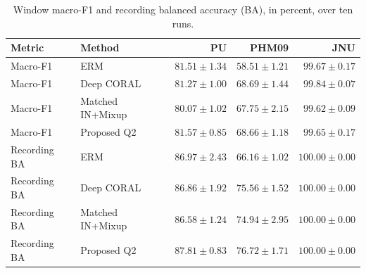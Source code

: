 \begin{table}[pos=htbp]
\centering\small
\caption{Window macro-F1 and recording balanced accuracy (BA), in percent, over ten runs.}
\label{tab:f1}
\begin{tabular}{llrrr}
\toprule
Metric & Method & PU & PHM09 & JNU\\
\midrule
Macro-F1 & ERM & $81.51\pm1.34$ & $58.51\pm1.21$ & $99.67\pm0.17$\\
Macro-F1 & Deep CORAL & $81.27\pm1.00$ & $68.69\pm1.44$ & $99.84\pm0.07$\\
Macro-F1 & Matched IN+Mixup & $80.07\pm1.02$ & $67.75\pm2.15$ & $99.62\pm0.09$\\
Macro-F1 & Proposed Q2 & $81.57\pm0.85$ & $68.66\pm1.18$ & $99.65\pm0.17$\\
Recording BA & ERM & $86.97\pm2.43$ & $66.16\pm1.02$ & $100.00\pm0.00$\\
Recording BA & Deep CORAL & $86.86\pm1.92$ & $75.56\pm1.52$ & $100.00\pm0.00$\\
Recording BA & Matched IN+Mixup & $86.58\pm1.24$ & $74.94\pm2.95$ & $100.00\pm0.00$\\
Recording BA & Proposed Q2 & $87.81\pm0.83$ & $76.72\pm1.71$ & $100.00\pm0.00$\\
\bottomrule
\end{tabular}
\end{table}
